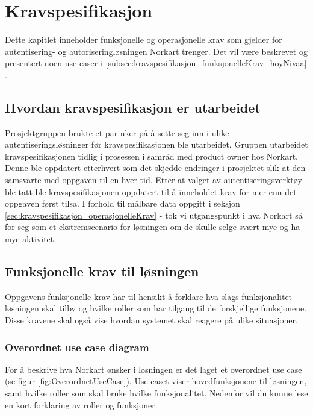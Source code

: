 \chapter{Kravspesifikasjon}
\label{chap:kravspesifikasjon}
Dette kapitlet inneholder funksjonelle og operasjonelle krav som gjelder for autentisering- og autoriseringløsningen Norkart trenger. Det vil være beskrevet og presentert noen use caser i \ref{subsec:kravspesifikasjon_funksjonelleKrav_hoyNivaa} .

\section{Hvordan kravspesifikasjon er utarbeidet}
\label{sec:kravspesifikasjon_hvordanKravspesifikasjonErUtarbeidet}
Prosjektgruppen brukte et par uker på å sette seg inn i ulike autentiseringsløsninger før kravspesifikasjonen ble utarbeidet. Gruppen utarbeidet kravspesifikasjonen tidlig i prosessen i samråd med product owner hos Norkart. Denne ble oppdatert etterhvert som det skjedde endringer i prosjektet slik at den samsvarte med oppgaven til en hver tid. Etter at valget av autentiseringsverktøy ble tatt ble kravspesifikasjonen oppdatert til å inneholdet krav for mer enn det oppgaven først tilsa. I forhold til målbare data oppgitt i seksjon \ref{sec:kravspesifikasjon_operasjonelleKrav} -   tok vi utgangspunkt i hva Norkart så for seg som et ekstremscenario for løsningen om de skulle selge svært mye og ha mye aktivitet. 
 
\section{Funksjonelle krav til løsningen}
\label{sec:kravspesifikasjon_funksjonelleKrav}
Oppgavens funksjonelle krav har til hensikt å forklare hva slags funksjonalitet løsningen skal tilby og hvilke roller som har tilgang til de forskjellige funksjonene. Disse kravene skal også vise hvordan systemet skal reagere på ulike situasjoner.

\subsection{Overordnet use case diagram}
\label{subsec:kravspesifikasjon_funksjonelleKrav_OverordnetUseCase}
For å beskrive hva Norkart ønsker i løsningen er det laget et overordnet use case  (se figur \ref{fig:OverordnetUseCase}). Use caset viser hovedfunksjonene til løsningen, samt hvilke roller som skal bruke hvilke funksjonalitet. Nedenfor vil du kunne lese en kort forklaring av roller og funksjoner.

